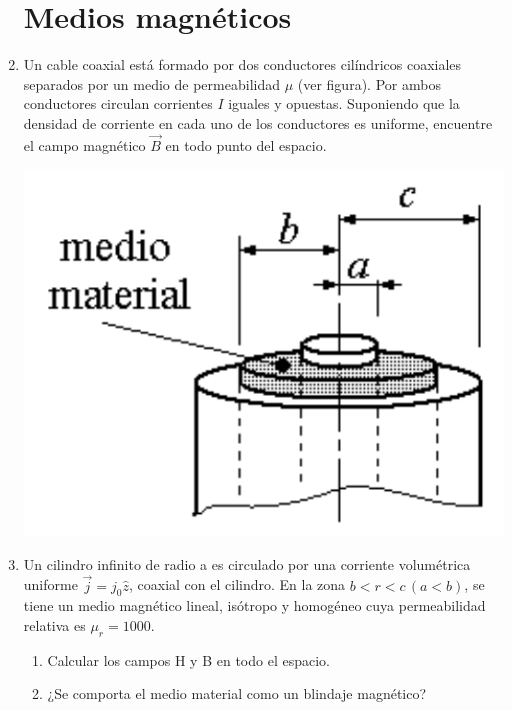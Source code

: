 \documentclass[11pt,spanish,a4paper]{article}
\begin{document}
\begin{enumerate}
\section*{Medios magnéticos}
  \vspace{-1cm}
  \item \begin{minipage}[t]{0.7\textwidth}
	Un cable coaxial está formado por dos conductores cilíndricos coaxiales separados por un medio de permeabilidad \(\mu\) (ver figura).
	Por ambos conductores circulan corrientes \(I\) iguales y opuestas.
	Suponiendo que la densidad de corriente en cada uno de los conductores es uniforme, encuentre el campo magnético \(\vec{B}\) en todo punto del espacio.
	\end{minipage}
	\begin{minipage}[c][7em][t]{0.25\textwidth}
  		\includegraphics[width=\textwidth]{p4e10}
	\end{minipage}


\item Un cilindro infinito de radio a es circulado por una corriente volumétrica uniforme \(\vec{j}= j_0 \hat{z}\), coaxial con el cilindro.
En la zona \(b < r < c\, (a < b)\), se tiene un medio magnético lineal, isótropo y homogéneo cuya permeabilidad relativa es \(\mu_r= 1000\).
\begin{enumerate}
\item Calcular los campos H y B en todo el espacio.
\item ¿Se comporta el medio material como un blindaje magnético? 
\end{enumerate}


\end{enumerate}
\end{document}
